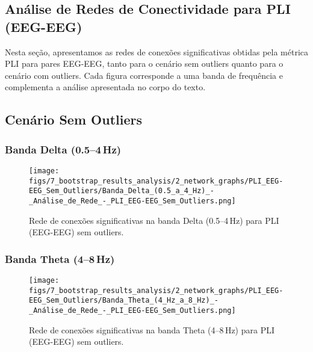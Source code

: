 
\begin{apendicesenv}

    \partapendices

    \chapter{Análise de Redes de Conectividade para PLI (EEG-EEG)}
    \label{apendice:pli_eeg_eeg}
    Nesta seção, apresentamos as redes de conexões significativas obtidas pela métrica PLI para pares EEG-EEG, tanto para o cenário sem outliers quanto para o cenário com outliers. Cada figura corresponde a uma banda de frequência e complementa a análise apresentada no corpo do texto.
    
    \section{Cenário Sem Outliers}
    
    \subsection{Banda Delta (0.5--4\,Hz)}
    \begin{figure}[H]
      \centering
      \texttt{[image: figs/7\_bootstrap\_results\_analysis/2\_network\_graphs/PLI\_EEG-EEG\_Sem\_Outliers/Banda\_Delta\_(0.5\_a\_4\_Hz)\_-\_Análise\_de\_Rede\_-\_PLI\_EEG-EEG\_Sem\_Outliers.png]}
      \caption{Rede de conexões significativas na banda Delta (0.5--4\,Hz) para PLI (EEG-EEG) sem outliers.}
      \label{fig:apend_pli_delta_sem}
    \end{figure}
    
    \subsection{Banda Theta (4--8\,Hz)}
    \begin{figure}[H]
      \centering
      \texttt{[image: figs/7\_bootstrap\_results\_analysis/2\_network\_graphs/PLI\_EEG-EEG\_Sem\_Outliers/Banda\_Theta\_(4\_Hz\_a\_8\_Hz)\_-\_Análise\_de\_Rede\_-\_PLI\_EEG-EEG\_Sem\_Outliers.png]}
      \caption{Rede de conexões significativas na banda Theta (4--8\,Hz) para PLI (EEG-EEG) sem outliers.}
      \label{fig:apend_pli_theta_sem}
    \end{figure}
    

\end{apendicesenv}

